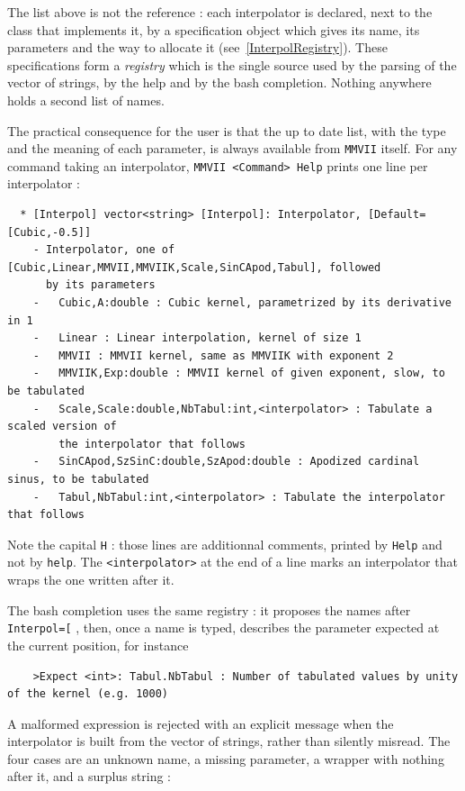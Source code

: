 The list above is not the reference : each interpolator is declared, next to the class that
implements it, by a specification object which gives its name, its parameters and the way to
allocate it (see~\ref{InterpolRegistry}).  These specifications form a \emph{registry} which is
the single source used by the parsing of the vector of strings, by the help and by the bash
completion.  Nothing anywhere holds a second list of names.

The practical consequence for the user is that the up to date list, with the type and the meaning
of each parameter, is always available from {\tt MMVII} itself.  For any command taking an
interpolator, {\tt MMVII <Command> Help}  prints one line per interpolator :

\begin{verbatim}
  * [Interpol] vector<string> [Interpol]: Interpolator, [Default=[Cubic,-0.5]]
    - Interpolator, one of [Cubic,Linear,MMVII,MMVIIK,Scale,SinCApod,Tabul], followed
      by its parameters
    -   Cubic,A:double : Cubic kernel, parametrized by its derivative in 1
    -   Linear : Linear interpolation, kernel of size 1
    -   MMVII : MMVII kernel, same as MMVIIK with exponent 2
    -   MMVIIK,Exp:double : MMVII kernel of given exponent, slow, to be tabulated
    -   Scale,Scale:double,NbTabul:int,<interpolator> : Tabulate a scaled version of
        the interpolator that follows
    -   SinCApod,SzSinC:double,SzApod:double : Apodized cardinal sinus, to be tabulated
    -   Tabul,NbTabul:int,<interpolator> : Tabulate the interpolator that follows
\end{verbatim}

Note the capital {\tt H} : those lines are additionnal comments, printed by {\tt Help} and not
by {\tt help}.  The {\tt <interpolator>} at the end of a line marks an interpolator that wraps
the one written after it.

The bash completion uses the same registry : it proposes the names after {\tt Interpol=[} , then,
once a name is typed, describes the parameter expected at the current position, for instance

\begin{verbatim}
    >Expect <int>: Tabul.NbTabul : Number of tabulated values by unity of the kernel (e.g. 1000)
\end{verbatim}

A malformed expression is rejected with an explicit message when the interpolator is built from
the vector of strings, rather than silently misread.  The four cases are an unknown name, a
missing parameter, a wrapper with nothing after it, and a surplus string :

